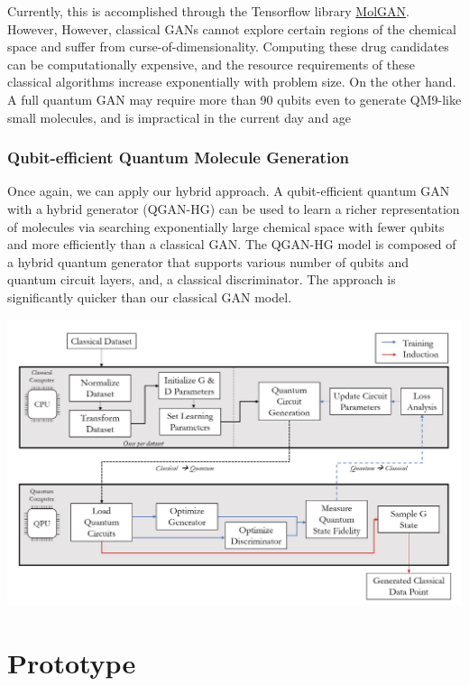 \documentclass{scrartcl}
\begin{document}
Currently, this is accomplished through the Tensorflow library \href{https://github.com/nicola-decao/MolGAN}{MolGAN}. However,  However, classical GANs cannot explore certain regions of the chemical space and suffer from curse-of-dimensionality. Computing these drug candidates can be computationally expensive, and the resource requirements of these classical algorithms increase exponentially with problem size. On the other hand. A full quantum GAN may require more than 90 qubits even to generate QM9-like small molecules, and is impractical in the current day and age

\subsubsection{Qubit-efficient Quantum Molecule Generation}
\label{sec:orgac8eb1e}

Once again, we can apply our hybrid approach. A qubit-efficient quantum GAN with a hybrid generator (QGAN-HG) can be used to learn a richer representation of molecules via searching exponentially large chemical space with fewer qubits and more efficiently than a classical GAN. The QGAN-HG model is composed of a hybrid quantum generator that supports various number of qubits and quantum circuit layers, and, a classical discriminator. The approach is significantly quicker than our classical GAN model.

\begin{center}
\includegraphics[width=.9\linewidth]{./assets/systemarchitecture.png}
\end{center}

\section{Prototype}
\label{sec:org2ab3ce7}
\end{document}
